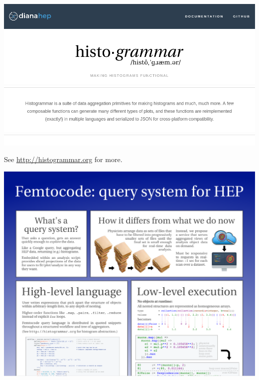 \documentclass{beamer}
\begin{document}
\begin{frame}{}

{\mbox{\hspace{-1 cm}\includegraphics[width=1.2\linewidth]{frontpage.png}}}

\vspace{0.5 cm}
See \textcolor{blue}{\underline{\url{http://histogrammar.org}}} for more.

\vspace{1.5 cm}
\end{frame}

\begin{frame}{}

{\mbox{\hspace{-1 cm}\includegraphics[width=1.2\linewidth]{femtocode.png}}}

\end{frame}
\end{document}
